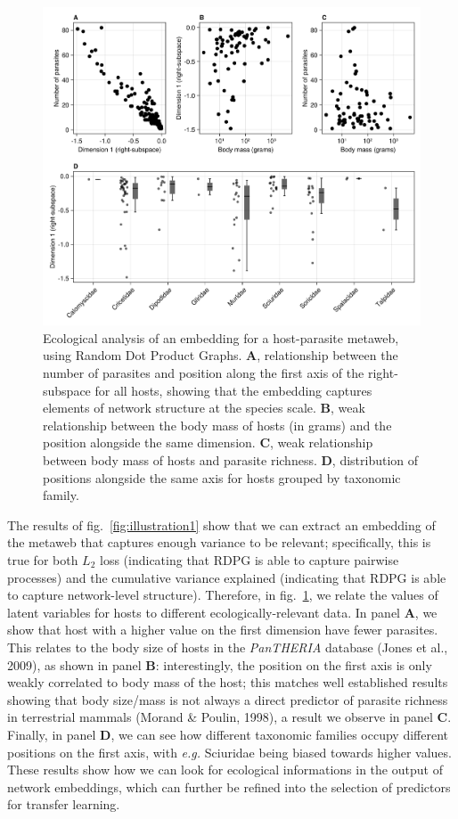 \documentclass[11pt]{article}
\makeatletter
\def\maxwidth{\ifdim\Gin@nat@width>\linewidth\linewidth
\else\Gin@nat@width\fi}
\let\Oldincludegraphics\includegraphics
\renewcommand{\includegraphics}[1]{\Oldincludegraphics[width=\maxwidth]{#1}}
\makeatother
\begin{document}
\begin{figure}
\hypertarget{fig:illustration2}{%
\centering
\includegraphics{figures/illustration-part2.png}
\caption{Ecological analysis of an embedding for a host-parasite
metaweb, using Random Dot Product Graphs. \textbf{A}, relationship
between the number of parasites and position along the first axis of the
right-subspace for all hosts, showing that the embedding captures
elements of network structure at the species scale. \textbf{B}, weak
relationship between the body mass of hosts (in grams) and the position
alongside the same dimension. \textbf{C}, weak relationship between body
mass of hosts and parasite richness. \textbf{D}, distribution of
positions alongside the same axis for hosts grouped by taxonomic
family.}\label{fig:illustration2}
}
\end{figure}

The results of fig.~\ref{fig:illustration1} show that we can extract an
embedding of the metaweb that captures enough variance to be relevant;
specifically, this is true for both \(L_2\) loss (indicating that RDPG
is able to capture pairwise processes) and the cumulative variance
explained (indicating that RDPG is able to capture network-level
structure). Therefore, in fig.~\ref{fig:illustration2}, we relate the
values of latent variables for hosts to different ecologically-relevant
data. In panel \textbf{A}, we show that host with a higher value on the
first dimension have fewer parasites. This relates to the body size of
hosts in the \emph{PanTHERIA} database (Jones et al., 2009), as shown in
panel \textbf{B}: interestingly, the position on the first axis is only
weakly correlated to body mass of the host; this matches well
established results showing that body size/mass is not always a direct
predictor of parasite richness in terrestrial mammals (Morand \& Poulin,
1998), a result we observe in panel \textbf{C}. Finally, in panel
\textbf{D}, we can see how different taxonomic families occupy different
positions on the first axis, with \emph{e.g.} Sciuridae being biased
towards higher values. These results show how we can look for ecological
informations in the output of network embeddings, which can further be
refined into the selection of predictors for transfer learning.
\end{document}
